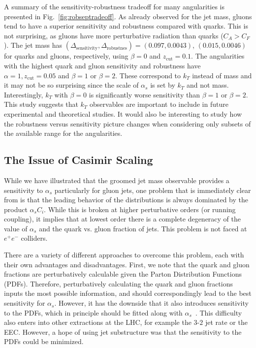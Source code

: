 A summary of the sensitivity-robustness tradeoff for many angularities
is presented in Fig.~\ref{fig:robseptradeoff}.  As already observed
for the jet mass, gluons tend to have a superior sensitivity and
robustness compared with quarks.  This is not surprising, as gluons
have more perturbative radiation than quarks ($C_A>C_F$).  The jet
mass has $(\Delta_\text{sensitivity},\Delta_\text{robustnes})=(0.097,0.0043)$, $(0.015,0.0046)$ for quarks and gluons, respectively, using $\beta=0$ and $z_\text{cut}=0.1$.
The angularities with the highest quark and gluon sensitivity and
robustness have $\alpha=1, z_\text{cut}=0.05$ and $\beta=1$ or $\beta=2$.  These correspond to $k_T$ instead of mass and it may not be so surprising since the scale of $\alpha_s$ is set by $k_T$ and not mass.  Interestingly, $k_T$ with $\beta=0$ is significantly worse sensitivity than $\beta=1$ or $\beta=2$.  This study suggests that $k_T$ observables are important to include in future experimental and theoretical studies.  It would also be interesting to study how the robustness versus sensitivity picture changes when considering only subsets of the available range for the angularities.



\subsection{The Issue of Casimir Scaling}
\label{sec:casimir}



While we have illustrated that the groomed jet mass observable provides a sensitivity to $\alpha_s$ particularly for gluon jets, one problem that is immediately clear from  is that the leading behavior of the distributions is always dominated by the product $\alpha_s C_i$. While this is broken at higher perturbative orders (or running coupling),  it implies that at lowest order there is a complete degeneracy of the value of $\alpha_s$ and the quark vs. gluon fraction of jets. This problem is not faced at $e^+e^-$ colliders.

There are a variety of different approaches to overcome this problem, each with their own advantages and disadvantages. First, we note that the quark and gluon fractions are perturbatively calculable given the Parton Distribution Functions (PDFs). Therefore, perturbatively calculating the quark and gluon fractions inputs the most possible information, and should correspondingly lead to the best sensitivity for $\alpha_s$. However, it has the downside that it also introduces sensitivity to the PDFs, which in principle should be fitted along with $\alpha_s$~\cite{Accardi:2016ndt}. This difficulty also enters into other extractions at the LHC, for example the $3$-$2$ jet rate or the EEC. However, a hope of using jet substructure was that the sensitivity to the PDFs could be minimized.

